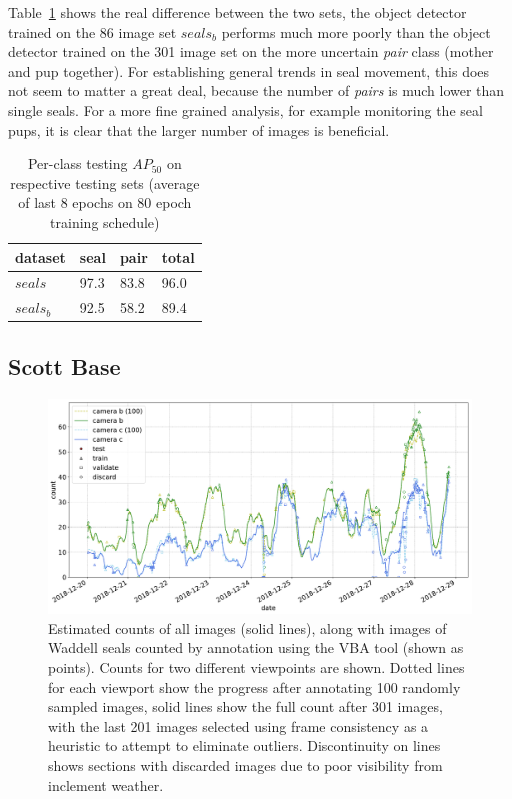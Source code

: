 Table~\ref{tab:seal_comparison} shows the real difference between the two sets, the object detector trained on the 86 image set $seals_b$ performs much more poorly than the object detector trained on the 301 image set on the more uncertain \emph{pair} class (mother and pup together). For establishing general trends in seal movement, this does not seem to matter a great deal, because the number of \emph{pairs} is much lower than single seals. For a more fine grained analysis, for example monitoring the seal pups, it is clear that the larger number of images is beneficial.

\begin{table}[tbh!]
    \centering
\caption{Per-class testing $AP_{50}$ on respective testing sets (average of last 8 epochs on 80 epoch training schedule) }    
\begin{tabular}{l|lll}
dataset & seal & pair & total \\
\toprule
$seals$       & 97.3      & 83.8      & 96.0      \\
$seals_b$     & 92.5      & 58.2      & 89.4       \\

\bottomrule
\end{tabular}
\label{tab:seal_comparison} 
\end{table}

 

\subsection{Scott Base \texorpdfstring{\cite{Eisert2019}}{}}

\begin{figure}[ht]
    \centering
    \includegraphics[width=1.0\linewidth]{charts/seals/scott_base_combined.pdf}
    \caption{Estimated counts  of all images (solid lines), along with images of Waddell seals counted by annotation using the \gls{VBA} tool (shown as points). Counts for two different viewpoints are shown. Dotted lines for each viewport show the progress after annotating 100 randomly sampled images, solid lines show the full count after 301 images, with the last 201 images selected using frame consistency as a heuristic to attempt to eliminate outliers. Discontinuity on lines shows sections with discarded images due to poor visibility from inclement weather. }
    \label{fig:scott_base}
\end{figure}

